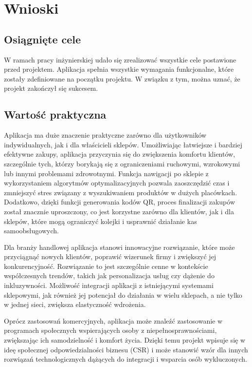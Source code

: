 \section{Wnioski}

\subsection{Osiągnięte cele}

W ramach pracy inżynierskiej udało się zrealizować wszystkie cele postawione przed projektem. Aplikacja spełnia wszystkie wymagania funkcjonalne, które zostały zdefiniowane na początku projektu. W związku z tym, można uznać, że projekt zakończył się sukcesem.

\subsection{Wartość praktyczna}

Aplikacja ma duże znaczenie praktyczne zarówno dla użytkowników indywidualnych, jak i dla właścicieli sklepów. Umożliwiając łatwiejsze i bardziej efektywne zakupy, aplikacja przyczynia się do zwiększenia komfortu klientów, szczególnie tych, którzy borykają się z ograniczeniami ruchowymi, wzrokowymi lub innymi problemami zdrowotnymi. Funkcja nawigacji po sklepie z wykorzystaniem algorytmów optymalizacyjnych pozwala zaoszczędzić czas i zmniejszyć stres związany z wyszukiwaniem produktów w dużych placówkach. Dodatkowo, dzięki funkcji generowania kodów QR, proces finalizacji zakupów został znacznie uproszczony, co jest korzystne zarówno dla klientów, jak i dla sklepów, które mogą ograniczyć kolejki i usprawnić działanie kas samoobsługowych.

Dla branży handlowej aplikacja stanowi innowacyjne rozwiązanie, które może przyciągnąć nowych klientów, poprawić wizerunek firmy i zwiększyć jej konkurencyjność. Rozwiązanie to jest szczególnie cenne w kontekście współczesnych trendów, takich jak personalizacja usług czy dążenie do inkluzywności. Możliwość integracji aplikacji z istniejącymi systemami sklepowymi, jak również jej potencjał do działania w wielu sklepach, a nie tylko w jednej sieci, zwiększa elastyczność wdrożenia.

Oprócz zastosowań komercyjnych, aplikacja może znaleźć zastosowanie w programach społecznych wspierających osoby z niepełnosprawnościami, zwiększając ich samodzielność i komfort życia. Dzięki temu projekt wpisuje się w ideę społecznej odpowiedzialności biznesu (CSR) i może stanowić wzór dla innych rozwiązań technologicznych dążących do integracji i wsparcia osób wykluczonych.